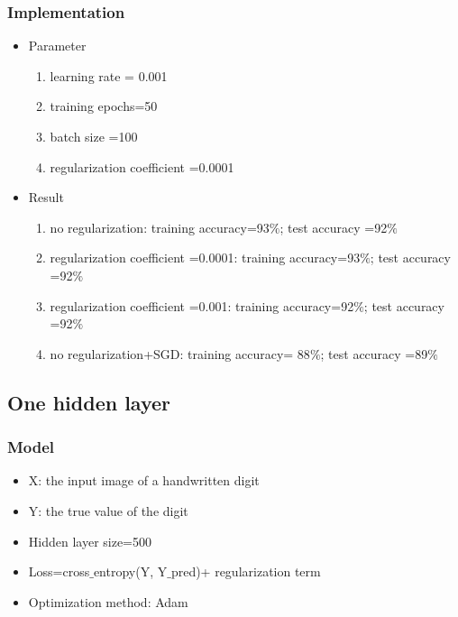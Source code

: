 \subsubsection{Implementation }
\begin{itemize}
\item Parameter
\begin{enumerate}
\item learning rate = 0.001
\item training epochs=50
\item batch size =100
\item regularization coefficient =0.0001
\end{enumerate}
\item Result
\begin{enumerate}
\item no regularization: training accuracy=93$\%$; test accuracy =92$\%$
\item regularization coefficient =0.0001: training accuracy=93$\%$; test accuracy =92$\%$
\item regularization coefficient =0.001: training accuracy=92$\%$; test accuracy =92$\%$
\item no regularization+SGD: training accuracy= 88$\%$; test accuracy =89$\%$
\end{enumerate}

\end{itemize}

\subsection{One hidden layer }
\subsubsection{Model}
\begin{itemize}
\item X: the input image of a handwritten digit
\item Y: the true value of the digit
\item Hidden layer size=500
\item Loss=cross$\_$entropy(Y, Y$\_$pred)+ regularization term
\item Optimization method: Adam
\end{itemize}

